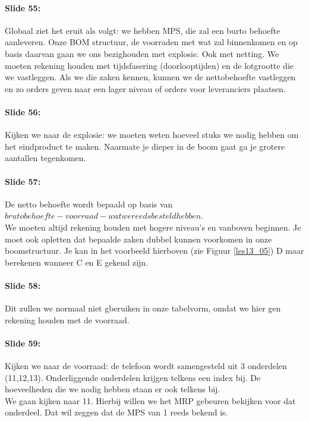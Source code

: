 \documentclass[10pt,a4paper]{report}
\begin{document}
\paragraph{Slide 55:} Globaal ziet het eruit als volgt: we hebben MPS, die zal een burto behoefte aanleveren. Onze BOM structuur, de voorraden met wat zal binnenkomen en op basis  daarvan gaan we ons bezighouden met explosie. Ook met netting. We moeten rekening houden met tijdsfasering (doorlooptijden) en de lotgrootte die we vastleggen. Als we die zaken kennen, kunnen we de nettobehoefte vastleggen en zo orders geven naar een lager niveau of orders voor leveranciers plaatsen. 

\paragraph{Slide 56:} Kijken we naar de explosie: we moeten weten hoeveel stuks we nodig hebben om het eindproduct te maken. Naarmate je dieper in de boom gaat ga je grotere aantallen tegenkomen. 

\paragraph{Slide 57:} De netto behoefte wordt bepaald op basis van $bruto behoefte - voorraad - wat we reeds besteld hebben$.\\
We moeten altijd rekening houden met hogere niveau's en vanboven beginnen. Je moet ook opletten dat bepaalde zaken dubbel kunnen voorkomen in onze boomstructuur. Je kan in het voorbeeld hierboven (zie Figuur \ref{les13_05}) D maar berekenen wanneer C en E gekend zijn. 

\paragraph{Slide 58:} Dit zullen we normaal niet gberuiken in onze tabelvorm, omdat we hier gen rekening houden met de voorraad. 

\paragraph{Slide 59:} Kijken we naar de voorraad: de telefoon wordt samengesteld uit 3 onderdelen (11,12,13). Onderliggende onderdelen krijgen telkens een index bij. De hoeveelheden die we nodig hebben staan er ook telkens bij.\\
We gaan kijken naar 11. Hierbij willen we het MRP gebeuren bekijken voor dat onderdeel. Dat wil zeggen dat de MPS van 1 reeds bekend is.
\end{document}
